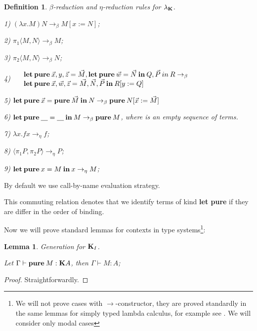 \documentclass[a4paper]{article}
\newtheorem{lemma}{Lemma}
\newtheorem{defin}{Definition}
\begin{document}
  \begin{defin} $\beta$-reduction and $\eta$-reduction rules for $\lambda_{{\bf K}}$.

  1) $(\lambda x. M) N \rightarrow_{\beta} M [x := N]$;

  2) $\pi_1 \langle M, N \rangle \rightarrow_{\beta} M$;

  3) $\pi_2 \langle M, N \rangle \rightarrow_{\beta} N$;

  4) $\begin{array}{llll}
  & {\bf let \: pure \:} \vec{x}, y, \vec{z} = \vec{M}, {\bf let \: pure \: } \vec{w} = \vec{N} {\: \bf in \: } Q, \vec{P} {\: in \:} R \rightarrow_{\beta} & \\
  & {\bf let \: pure \:} \vec{x}, \vec{w}, \vec{z} = \vec{M}, \vec{N}, \vec{P} {\: \bf in \: } R [y := Q]
  \end{array}$

  5) ${\bf let \: pure \:} \vec{x} = {\bf pure \:} \vec{M} {\: \bf in \:} N \rightarrow_{\beta} {\bf pure \:} N [\vec{x} := \vec{M}]$

  6) ${\bf let \: pure \:} \underline{\quad} = \underline{\quad} {\: \bf in \:} M \rightarrow_{\beta} {\bf pure \:} M$, where \underline{\quad} is an empty sequence of terms.

  7) $\lambda x. f x \rightarrow_{\eta} f$;

  8) $\langle \pi_1 P, \pi_2 P \rangle \rightarrow_{\eta} P$;

  9) ${\bf let \: pure \:} x = M {\: \bf in \: } x \rightarrow_{\eta} M$;

  \end{defin}

By default we use call-by-name evaluation strategy.

This commuting relation denotes that we identify terms of kind {\bf let pure} if they are differ in the order of binding.

Now we will prove standard lemmas for contexts in type systems\footnote{We will not prove cases with
$\to$-constructor, they are proved standardly in the same lemmas for simply typed lambda calculus, for
example see \cite{Neder} \cite{Morten}. We will consider only modal cases}:

\begin{lemma} Generation for ${\bf K}_I$.

  Let $\Gamma \vdash {\bf pure \:} M : {\bf K}A$, then $\Gamma \vdash M : A$;
\end{lemma}

\begin{proof}
  Straightforwardly.
\end{proof}
\end{document}
